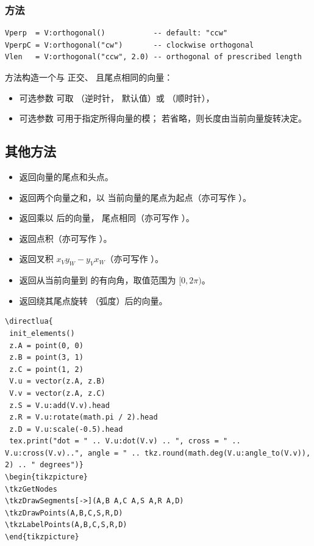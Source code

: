 \subsubsection{方法  }
\label{ssub:method_vector_orthogonal_r}

\begin{verbatim}
Vperp  = V:orthogonal()           -- default: "ccw"
VperpC = V:orthogonal("cw")       -- clockwise orthogonal
Vlen   = V:orthogonal("ccw", 2.0) -- orthogonal of prescribed length
\end{verbatim}

 方法构造一个与  正交、
且尾点相同的向量：
\begin{itemize}
  \item 可选参数  可取 （逆时针，
        默认值）或 （顺时针），
  \item 可选参数  可用于指定所得向量的模；
        若省略，则长度由当前向量旋转决定。
\end{itemize}

\subsection{其他方法}
\label{sub:vector_other_methods}

\begin{itemize}
  \item {} 返回向量的尾点和头点。
  \item {} 返回两个向量之和，以
        当前向量的尾点为起点（亦可写作 ）。
  \item {} 返回乘以  后的向量，
        尾点相同（亦可写作 ）。
  \item {} 返回点积（亦可写作 ）。
  \item {} 返回叉积
        $x_V y_W - y_V x_W$（亦可写作 ）。
  \item {} 返回从当前向量到
         的有向角，取值范围为 $[0, 2\pi)$。
  \item {} 返回绕其尾点旋转
        （弧度）后的向量。
\end{itemize}

\begin{verbatim}
\directlua{
 init_elements()
 z.A = point(0, 0)
 z.B = point(3, 1)
 z.C = point(1, 2)
 V.u = vector(z.A, z.B)
 V.v = vector(z.A, z.C)
 z.S = V.u:add(V.v).head
 z.R = V.u:rotate(math.pi / 2).head
 z.D = V.u:scale(-0.5).head
 tex.print("dot = " .. V.u:dot(V.v) .. ", cross = " .. V.u:cross(V.v)..", angle = " .. tkz.round(math.deg(V.u:angle_to(V.v)), 2) .. " degrees")}
\begin{tikzpicture}
\tkzGetNodes
\tkzDrawSegments[->](A,B A,C A,S A,R A,D)
\tkzDrawPoints(A,B,C,S,R,D)
\tkzLabelPoints(A,B,C,S,R,D)
\end{tikzpicture}
\end{verbatim}

